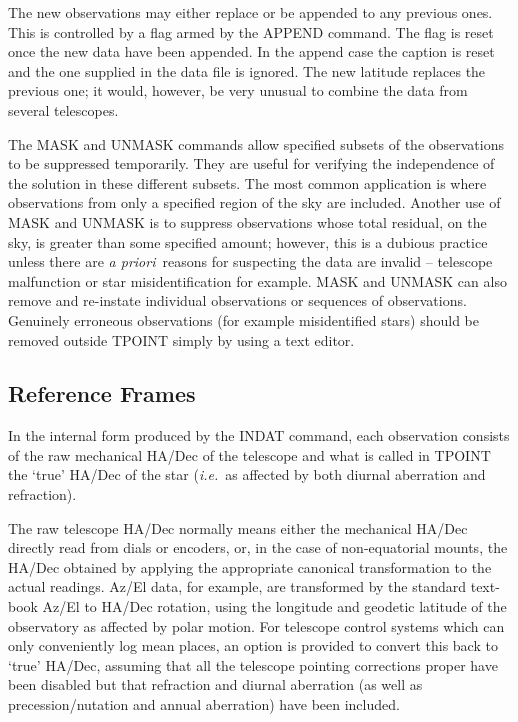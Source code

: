 The new observations may either replace or be appended to any
previous ones.  This is controlled by a flag armed by the
APPEND command.  The flag is reset
once the new data have
been appended.  In the append case the caption is reset and
the one supplied in the data file is ignored.  The new latitude
replaces the previous one;  it would, however, be very unusual
to combine the data from several telescopes.

The MASK and UNMASK commands allow specified subsets of
the observations to be suppressed temporarily.  They are useful
for verifying the independence of the solution in these different
subsets.  The most common application is where observations from only
a specified region of the sky are included.  Another use of
MASK and UNMASK is
to suppress observations whose total residual, on the sky, is
greater than some specified amount;
however, this is a dubious practice
unless there are {\it a priori}\, reasons for suspecting the data are
invalid -- telescope malfunction or star misidentification for
example.
MASK and UNMASK can also remove and re-instate individual
observations or sequences of observations.  Genuinely erroneous
observations (for example misidentified stars) should be removed
outside TPOINT simply by using a text editor.

\subsection{Reference Frames}
In the internal form produced by the INDAT command, each observation
consists of the raw mechanical HA/Dec of the telescope
and what is called in TPOINT the `true' HA/Dec of the star
({\it i.e.}\ as affected by both diurnal aberration and refraction).

The raw telescope HA/Dec normally means either the mechanical
HA/Dec directly read from dials or encoders, or, in the case of
non-equatorial mounts, the HA/Dec obtained by applying the
appropriate canonical transformation to the actual readings.
Az/El data, for example, are transformed by the standard
text-book Az/El to HA/Dec rotation, using the longitude
and geodetic latitude of the observatory as affected by polar motion.
For telescope control systems which can only conveniently log
mean places, an option is provided to convert this back to
`true' HA/Dec, assuming that all the telescope pointing
corrections proper have been disabled but that refraction and
diurnal aberration (as well as precession/nutation and annual
aberration) have been included.


